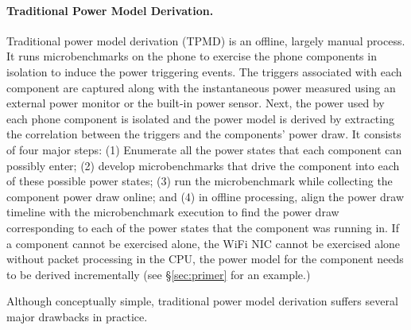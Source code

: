 \paragraph{Traditional Power Model Derivation.}
\label{subsec:tpmd}
Traditional power model derivation (TPMD) is an offline, largely manual process. 
It runs microbenchmarks on the phone to exercise the phone components 
in isolation to induce the power triggering events. The triggers 
associated with each component are captured along with the 
instantaneous power measured using an external power monitor 
or the built-in power sensor. Next, the power used by each 
phone component is isolated and the power model is derived 
by extracting the correlation between the triggers and the components’ power draw.
\fi
It consists of four major steps: 
%
(1) Enumerate all the power states that each component can possibly enter;  
% 
(2) develop  microbenchmarks that drive the component into each of these 
possible power states; 
%
(3) run the microbenchmark while collecting the component power draw online; and 
%
(4) in offline processing, 
align the power draw timeline with the microbenchmark execution 
to find the power draw corresponding to each of the power states 
that the component was running in. If a component cannot be exercised alone,
\eg the WiFi NIC cannot be exercised alone without packet 
processing in the CPU, the power model for the component needs 
to be derived incrementally (see \S\ref{sec:primer} for an example.)

Although conceptually simple, traditional power model derivation suffers several major drawbacks
in practice. 


